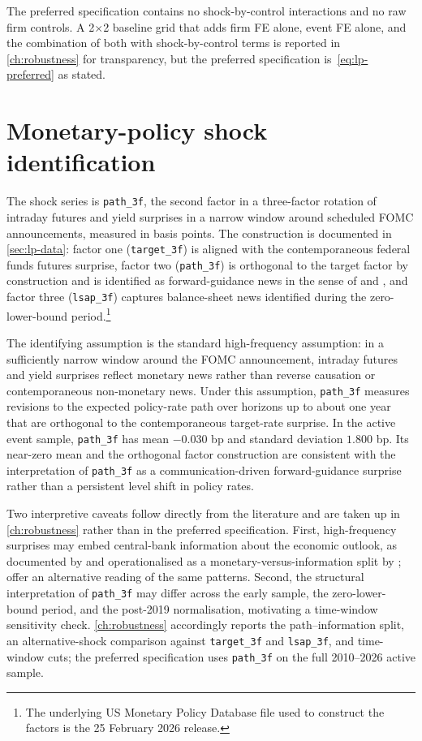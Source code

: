 The preferred specification contains no shock-by-control interactions and no raw firm controls. A 2$\times$2 baseline grid that adds firm FE alone, event FE alone, and the combination of both with shock-by-control terms is reported in \cref{ch:robustness} for transparency, but the preferred specification is~\eqref{eq:lp-preferred} as stated.

\section{Monetary-policy shock identification}
\label{sec:emp-shock}

The shock series is \texttt{path\_3f}, the second factor in a three-factor rotation of intraday futures and yield surprises in a narrow window around scheduled FOMC announcements, measured in basis points. The construction is documented in \cref{sec:lp-data}: factor one (\texttt{target\_3f}) is aligned with the contemporaneous federal funds futures surprise, factor two (\texttt{path\_3f}) is orthogonal to the target factor by construction and is identified as forward-guidance news in the sense of \citet{gurkaynakSackSwanson2005} and \citet{swanson2021}, and factor three (\texttt{lsap\_3f}) captures balance-sheet news identified during the zero-lower-bound period.\footnote{The underlying US Monetary Policy Database file used to construct the factors is the 25 February 2026 release.}

The identifying assumption is the standard high-frequency assumption: in a sufficiently narrow window around the FOMC announcement, intraday futures and yield surprises reflect monetary news rather than reverse causation or contemporaneous non-monetary news. Under this assumption, \texttt{path\_3f} measures revisions to the expected policy-rate path over horizons up to about one year that are orthogonal to the contemporaneous target-rate surprise. In the active event sample, \texttt{path\_3f} has mean $-0.030$ bp and standard deviation $1.800$ bp. Its near-zero mean and the orthogonal factor construction are consistent with the interpretation of \texttt{path\_3f} as a communication-driven forward-guidance surprise rather than a persistent level shift in policy rates.

Two interpretive caveats follow directly from the literature and are taken up in \cref{ch:robustness} rather than in the preferred specification. First, high-frequency surprises may embed central-bank information about the economic outlook, as documented by \citet{nakamuraSteinsson2018} and operationalised as a monetary-versus-information split by \citet{jarocinskiKaradi2020}; \citet{bauerSwanson2023} offer an alternative reading of the same patterns. Second, the structural interpretation of \texttt{path\_3f} may differ across the early sample, the zero-lower-bound period, and the post-2019 normalisation, motivating a time-window sensitivity check. \cref{ch:robustness} accordingly reports the path--information split, an alternative-shock comparison against \texttt{target\_3f} and \texttt{lsap\_3f}, and time-window cuts; the preferred specification uses \texttt{path\_3f} on the full 2010--2026 active sample.

